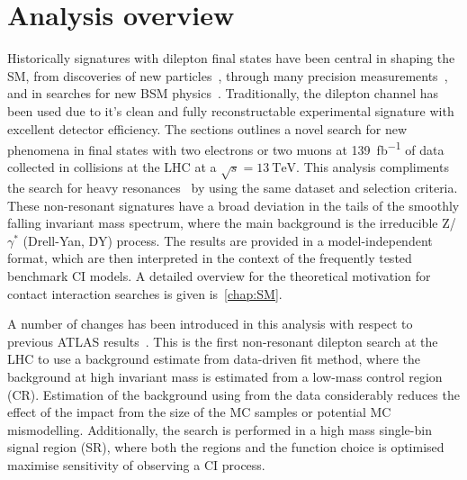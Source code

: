 \chapter{Analysis overview}\label{chap:analyintro}


Historically signatures with dilepton final states have been central in shaping the SM, from discoveries of new particles~\cite{PhysRevLett.33.1404, PhysRevLett.33.1406,1977PhRvL..39..252H,1983398,BAGNAIA1983130}, through many precision measurements~\cite{ALEPH:2005ab,Aad:2016zzw,Aad:2016izn,Sirunyan:2018swq}, and in searches for new BSM physics~\cite{Aad:2019fac,Sirunyan:2018exx,Sirunyan:2018ipj,EXOT-2016-05}. Traditionally, the dilepton channel has been used due to it's clean and fully reconstructable experimental signature with excellent detector efficiency. The sections outlines a novel search for new phenomena in final states with two electrons or two muons at \SI{139}{\femto\barn^{-1}} of data collected in \protonproton collisions at the LHC at a $\sqrt{s}=\SI{13}{\tera\electronvolt}$. This analysis compliments the search for heavy resonances~\cite{Aad:2019fac} by using the same dataset and selection criteria. These non-resonant signatures have a broad deviation in the tails of the smoothly falling invariant mass spectrum, where the main background is the irreducible Z/$\gamma^*$ (Drell-Yan, DY) process. The results are provided in a model-independent format, which are then interpreted in the context of the frequently tested benchmark CI models. A detailed overview for the theoretical motivation for contact interaction searches is given is~\cref{chap:SM}.

A number of changes has been introduced in this analysis with respect to previous ATLAS results~\cite{EXOT-2016-05}. This is the first non-resonant dilepton search at the LHC to use a background estimate from data-driven fit method, where the background at high invariant mass is estimated from a low-mass control region (CR). Estimation of the background using from the data considerably reduces the effect of the impact from the size of the MC samples or potential MC mismodelling. Additionally, the search is performed in a high mass single-bin signal region (SR), where both the regions and the function choice is optimised maximise sensitivity of observing a CI process. 

